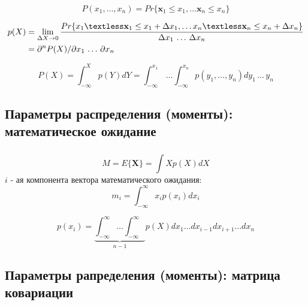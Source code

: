 \documentclass{beamer}
\begin{document}
\begin{frame}
  \frametitle{\insertsection}
  \framesubtitle{\insertsubsection}
  \begin{equation*}
   P(x_1, \ldots, x_n) = Pr\{\mathbf{x}_1 \le x_1, \ldots \mathbf{x}_n \le x_n \}
  \end{equation*}

  \begin{align*}
    p(X) &=
    \lim_{\Delta X \rightarrow 0}
    \frac{
      Pr\{x_1 \textless \mathbf{x}_1 \le x_1 + \Delta x_1, \ldots x_n \textless \mathbf{x}_n \le x_n + \Delta x_n \}
    }
         {\Delta x_1 \, \ldots \, \Delta x_n} \\
         &= \partial^n P(X) / \partial x_1 \, \ldots \, \partial x_n
  \end{align*}

  \begin{equation*}
   P(X) = \int_{-\infty}^{X} p(Y) dY = \int_{-\infty}^{x_1} \, \ldots \int_{-\infty}^{x_n} p(y_1, \ldots, y_n) d y_1 \, \ldots \, y_n
  \end{equation*}


\end{frame}

\subsection{Параметры распределения (моменты): математическое ожидание}

\begin{frame}
  \frametitle{\insertsection}
  \framesubtitle{\insertsubsection}

  \begin{equation*}
    M = E\{ \mathbf{X} \} = \int X p(X) dX
  \end{equation*}
  $i$ - ая компонента вектора математического ожидания:
  \begin{equation*}
    m_i = \int_{-\infty}^{\infty} x_i p(x_i) dx_i
  \end{equation*}

  \begin{equation*}
    p(x_i) = \underbrace{\int_{-\infty}^{\infty} \ldots \int_{-\infty}^{\infty}}_{n - 1} p(X) dx_1 \ldots d x_{i - 1} d x_{i + 1} \ldots d x_n
  \end{equation*}

\end{frame}

\subsection{Параметры рапределения (моменты): матрица ковариации}
\end{document}
